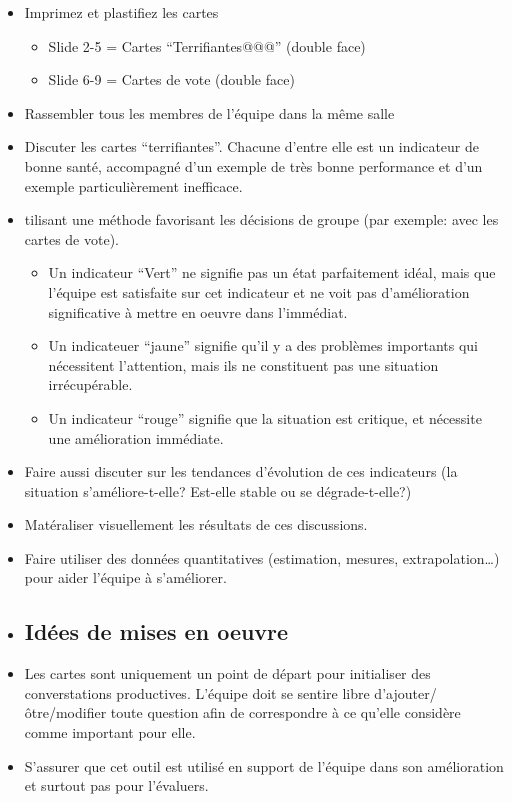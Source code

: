 \documentclass[a4paper]{article}
\begin{document}
\begin{itemize}
\item Imprimez et plastifiez les cartes


\begin{itemize}
\item Slide 2-5 = Cartes ``Terrifiantes@@@'' (double face)
\item Slide 6-9 = Cartes de vote (double face)
\end{itemize}
\item Rassembler tous les membres de l'équipe dans la même salle
\item Discuter les cartes ``terrifiantes''. Chacune d'entre elle est un indicateur de bonne santé, accompagné d'un exemple de très bonne performance et d'un exemple particulièrement inefficace.
\item tilisant une méthode favorisant les décisions de groupe (par exemple: avec les cartes de vote).


\begin{itemize}
\item Un indicateur ``Vert'' ne signifie pas un état parfaitement idéal, mais que l'équipe est satisfaite sur cet indicateur et ne voit pas d'amélioration significative à mettre en oeuvre dans l'immédiat.
\item Un indicateuer ``jaune'' signifie qu'il y a des problèmes importants qui nécessitent l'attention, mais ils ne constituent pas une situation irrécupérable.
\item Un indicateur ``rouge'' signifie que la situation est critique, et nécessite une amélioration immédiate.
\end{itemize}
\item Faire aussi discuter sur les tendances d'évolution de ces indicateurs (la situation s'améliore-t-elle? Est-elle stable ou se dégrade-t-elle?)
\item Matéraliser visuellement les résultats de ces discussions.
\item Faire utiliser des données quantitatives (estimation, mesures, extrapolation\ldots{}) pour aider l'équipe à s'améliorer.
\item \subsection{Idées de mises en oeuvre}
\item Les cartes sont uniquement un point de départ pour initialiser des converstations productives. L'équipe doit se sentire libre d'ajouter/ôtre/modifier toute question afin de correspondre à ce qu'elle considère comme important pour elle.
\item S'assurer que cet outil est utilisé en support de l'équipe dans son amélioration et surtout pas pour l'évaluers.
\end{itemize}
\end{document}
